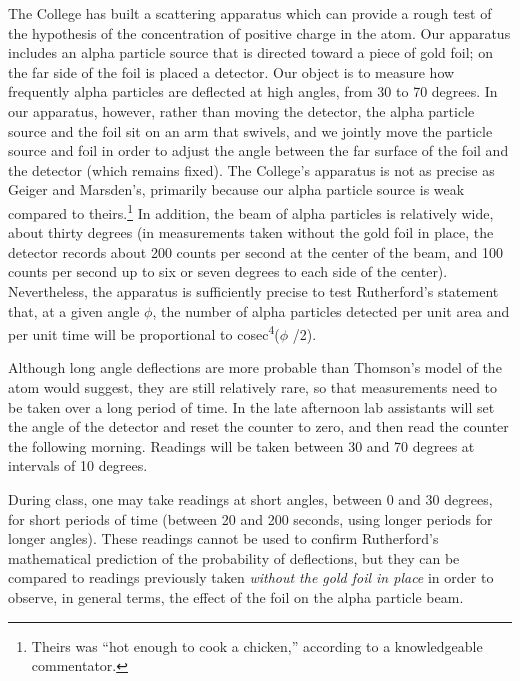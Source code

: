 The College has built a scattering apparatus which can provide a rough
test of the hypothesis of the concentration of positive charge in the atom. 
Our apparatus includes an alpha
particle source that is directed toward a piece of gold foil; on the far
side of the foil is placed a detector. Our object is to measure how
frequently alpha particles are deflected at high angles, from 30 to 70
degrees. In our apparatus, however, rather than moving the detector, the
alpha particle source and the foil sit on an arm that swivels, and we
jointly move the particle source and foil in order to adjust the angle
between the far surface of the foil and the detector (which remains
fixed). The College's apparatus is not as precise as Geiger and
Marsden's, primarily because our alpha particle source is weak compared
to theirs.\footnote{Theirs was ``hot enough to cook a chicken,''
  according to a knowledgeable commentator.} In addition, the beam of
alpha particles is relatively wide, about thirty degrees (in
measurements taken without the gold foil in place, the detector records
about 200 counts per second at the center of the beam, and 100 counts
per second up to six or seven degrees to each side of the center).
Nevertheless, the apparatus is sufficiently precise to test Rutherford's
statement that, at a given angle $\phi$, the number of alpha particles
detected per unit area and per unit time will be proportional to
cosec\textsuperscript{4}($\phi$ /2).

Although long angle deflections are more probable than Thomson's model
of the atom would suggest, they are still relatively rare, so that
measurements need to be taken over a long period of time. In the late
afternoon lab assistants will set the angle of the detector and reset
the counter to zero, and then read the counter the following morning.
Readings will be taken between 30 and 70 degrees at intervals of 10
degrees.

During class, one may take readings at short angles, between 0 and 30
degrees, for short periods of time (between 20 and 200 seconds, using
longer periods for longer angles). These readings cannot be used to
confirm Rutherford's mathematical prediction of the probability of
deflections, but they can be compared to readings previously taken
\emph{without the gold foil in place} in order to observe, in general
terms, the effect of the foil on the alpha particle beam.


